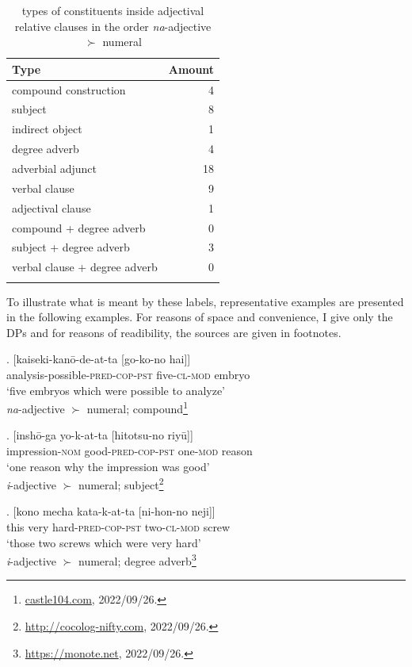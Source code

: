 \begin{table}[p]
\begin{tabular}{lr}
\lsptoprule
Type & Amount \\
\midrule
compound construction  & 4  \\
subject & 8  \\
indirect object & 1  \\
degree adverb & 4 \\
adverbial adjunct & 18 \\
verbal clause & 9 \\
adjectival clause & 1 \\
compound + degree adverb & 0 \\
subject + degree adverb & 3 \\
verbal clause + degree adverb & 0 \\
\lspbottomrule
\end{tabular}
\caption{types of constituents inside adjectival relative clauses in the order \textit{na}-adjective $\succ$ numeral}
\label{orderingtable2}
\end{table}

\largerpage
To illustrate what is meant by these labels, representative examples are presented in the following examples. For reasons of space and convenience, I give only the DPs and for reasons of readibility, the sources are given in footnotes.

\exg. [kaiseki-kanō-de-at-ta [go-ko-no hai]]\\
analysis-possible-\textsc{pred-cop-pst} five-\textsc{cl-mod} embryo\\
`five embryos which were possible to analyze'\\ \null \hfill \textit{na}-adjective $\succ$ numeral; compound\footnote{\url{castle104.com}, 2022/09/26.}

\exg. [inshō-ga yo-k-at-ta [hitotsu-no riyū]] \\
impression-\textsc{nom} good-\textsc{pred-cop-pst} one-\textsc{mod} reason\\
`one reason why the impression was good' \\ \null \hfill \textit{i}-adjective $\succ$ numeral; subject\footnote{\url{http://cocolog-nifty.com}, 2022/09/26.}

\exg. [kono mecha kata-k-at-ta [ni-hon-no neji]]\\
this very hard-\textsc{pred-cop-pst} two-\textsc{cl-mod} screw\\
`those two screws which were very hard'\\ \null \hfill \textit{i}-adjective $\succ$ numeral; degree adverb\footnote{\url{https://monote.net}, 2022/09/26.}

